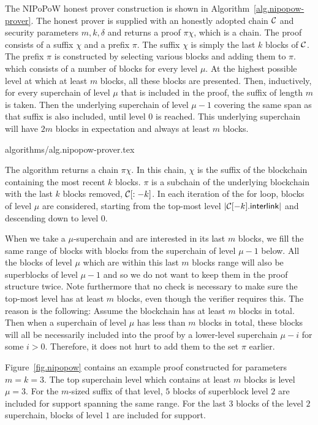 The NIPoPoW honest prover construction is shown in
Algorithm~\ref{alg.nipopow-prover}. The honest prover is supplied with an
honestly adopted chain $\mathcal{C}$ and security parameters $m, k, \delta$ and
returns a proof $\pi\chi$, which is a chain. The proof consists of a suffix
$\chi$ and a prefix $\pi$. The suffix $\chi$ is simply the last $k$ blocks of
$\mathcal{C}$. The prefix $\pi$ is constructed by selecting various blocks and adding
them to $\pi$. which consists of a number of blocks for every level $\mu$. At
the highest possible level at which at least $m$ blocks, all these blocks are
presented. Then, inductively, for every superchain of level $\mu$ that is
included in the proof, the suffix of length $m$ is taken. Then the underlying
superchain of level $\mu - 1$ covering the same span as that suffix is also
included, until level $0$ is reached. This underlying superchain will have $2m$
blocks in expectation and always at least $m$ blocks.

{algorithms/alg.nipopow-prover.tex}

The algorithm returns a chain $\pi\chi$. In this chain, $\chi$ is the suffix of
the blockchain containing the most recent $k$ blocks. $\pi$ is a subchain of the
underlying blockchain with the last $k$ blocks removed, $\mathcal{C}[:-k]$. In each
iteration of the for loop, blocks of level $\mu$ are considered, starting from
the top-most level $|\mathcal{C}[-k].\textsf{interlink}|$ and descending down to
level $0$.

When we take a
$\mu$-superchain and are interested in its last $m$ blocks, we fill the same
range of blocks with blocks from the superchain of level $\mu - 1$ below. All
the blocks of level $\mu$ which are within this last $m$ blocks range will also
be superblocks of level $\mu - 1$ and so we do not want to keep them in the
proof structure twice.  Note furthermore that no check is necessary to make sure
the top-most level has at least $m$ blocks, even though the verifier requires
this. The reason is the following: Assume the blockchain has at least $m$ blocks
in total. Then when a superchain of level $\mu$ has less than $m$ blocks in
total, these blocks will all be necessarily included into the proof by a
lower-level superchain $\mu - i$ for some $i > 0$. Therefore, it does not hurt
to add them to the set $\pi$ earlier.

Figure~\ref{fig.nipopow} contains an example proof constructed for parameters
$m = k = 3$. The top superchain level which contains at least $m$ blocks is
level $\mu = 3$. For the $m$-sized suffix of that level, $5$ blocks of
superblock level $2$ are included for support spanning the same range. For the
last $3$ blocks of the level $2$ superchain, blocks of level $1$ are included
for support.

